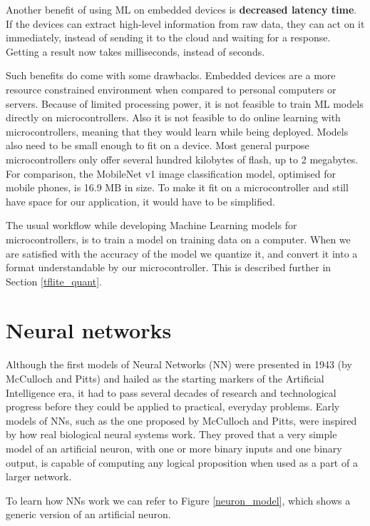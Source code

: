Another benefit of using ML on embedded devices is \textbf{decreased latency time}.
If the devices can extract high-level information from raw data, they can act on it immediately, instead of sending it to the cloud and waiting for a response. 
Getting a result now takes milliseconds, instead of seconds.

Such benefits do come with some drawbacks.
Embedded devices are a more resource constrained environment when compared to personal computers or servers.
Because of limited processing power, it is not feasible to train ML models directly on microcontrollers.
Also it is not feasible to do online learning with microcontrollers, meaning that they would learn while being deployed.
Models also need to be small enough to fit on a device. 
Most general purpose microcontrollers only offer several hundred kilobytes of flash, up to 2 megabytes.
For comparison, the MobileNet v1 image classification model, optimised for mobile phones, is 16.9 MB in size\cite{daniel_edgeimpulse}.
To make it fit on a microcontroller and still have space for our application, it would have to be simplified.

The usual workflow while developing Machine Learning models for microcontrollers, is to train a model on training data on a computer. 
When we are satisfied with the accuracy of the model we quantize it, and convert it into a format understandable by our microcontroller.
This is  described further in Section \ref{tflite_quant}.


\section{ Neural networks}\label{neural_networks_section}

Although the first models of Neural Networks (NN) were presented in 1943 (by McCulloch and Pitts)\cite{geron} and hailed as the starting markers of the Artificial Intelligence era, it had to pass several decades of research and technological progress before they could be applied to practical, everyday problems.
Early models of NNs, such as the one proposed by McCulloch and Pitts, were inspired by how real biological neural systems work. 
They proved that a very simple model of an artificial neuron, with one or more binary inputs and one binary output, is capable of computing any logical proposition when used as a part of a larger network\cite{geron}.

To learn how NNs work we can refer to Figure \ref{neuron_model}, which shows a generic version of an artificial neuron.
\newline

